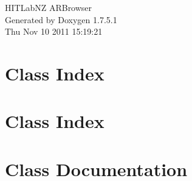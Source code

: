 \documentclass[a4paper]{book}
\begin{document}
\hypersetup{pageanchor=false,citecolor=blue}
\begin{titlepage}
\vspace*{7cm}
\begin{center}
{\Large \-H\-I\-T\-Lab\-N\-Z \-A\-R\-Browser }\\
\vspace*{1cm}
{\large \-Generated by Doxygen 1.7.5.1}\\
\vspace*{0.5cm}
{\small Thu Nov 10 2011 15:19:21}\\
\end{center}
\end{titlepage}
\clearemptydoublepage
{}
\tableofcontents
\clearemptydoublepage
{}
\hypersetup{pageanchor=true,citecolor=blue}
\chapter{\-Class \-Index}

\chapter{\-Class \-Index}

\chapter{\-Class \-Documentation}















\printindex
\end{document}
